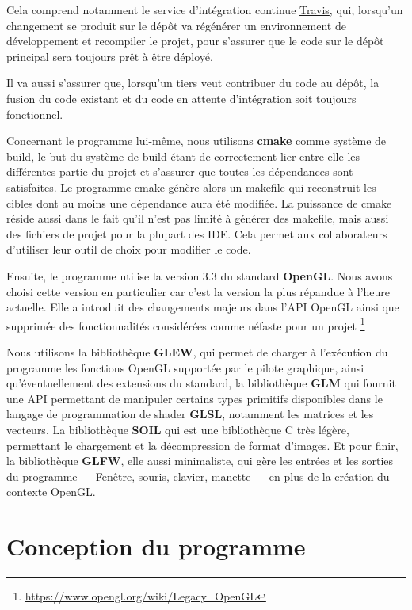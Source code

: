 \documentclass[11pt, a4paper, titlepage]{article}
\begin{document}
Cela comprend notamment le service d'intégration continue \href{https://travis-ci.org/nbouteme/OpenGL-Demo}{{\color{blue}Travis}}, qui, lorsqu'un 
changement se produit sur le dépôt va régénérer un environnement de développement et recompiler le projet, pour s'assurer que le 
code sur le dépôt principal sera toujours prêt à être déployé.

Il va aussi s'assurer que, lorsqu'un tiers veut contribuer du code au dépôt, la fusion du code existant et du code en attente d'intégration
soit toujours fonctionnel.

Concernant le programme lui-même, nous utilisons \textbf{cmake} comme système de build, le but du système de build étant de correctement lier entre
elle les différentes partie du projet et s'assurer que toutes les dépendances sont satisfaites. Le programme cmake génère alors un makefile qui
reconstruit les cibles dont au moins une dépendance aura été modifiée. La puissance de cmake réside aussi dans le fait qu'il n'est pas limité à générer
des makefile, mais aussi des fichiers de projet pour la plupart des IDE. Cela permet aux collaborateurs d'utiliser leur outil de choix pour modifier le code.

Ensuite, le programme utilise la version 3.3 du standard \textbf{OpenGL}.
Nous avons choisi cette version en particulier car c'est la version la plus répandue à l'heure actuelle. Elle a introduit des changements majeurs
dans l'API OpenGL ainsi que supprimée des fonctionnalités considérées comme néfaste pour un projet \footnote{\url{https://www.opengl.org/wiki/Legacy_OpenGL}}

Nous utilisons la bibliothèque \textbf{GLEW}, qui permet de charger à l'exécution du programme les fonctions OpenGL supportée par le pilote graphique, ainsi 
qu'éventuellement des extensions du standard, la bibliothèque \textbf{GLM} qui fournit une API permettant de manipuler certains types primitifs disponibles
dans le langage de programmation de shader \textbf{GLSL}, notamment les matrices et les vecteurs. La bibliothèque \textbf{SOIL} qui est une bibliothèque C très
légère, permettant le chargement et la décompression de format d'images. Et pour finir, la bibliothèque \textbf{GLFW}, elle aussi minimaliste, qui gère les 
entrées et les sorties du programme --- Fenêtre, souris, clavier, manette --- en plus de la création du contexte OpenGL.

\section{Conception du programme}
\end{document}

